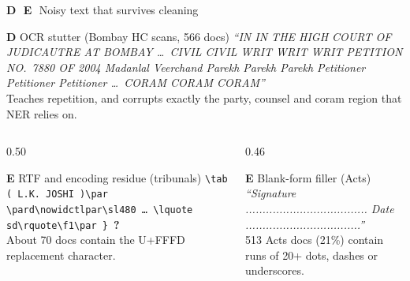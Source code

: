 \documentclass[aspectratio=169,11pt]{beamer}
\newcommand{\bs}{\textbackslash}
\newcommand{\pb}[1]{\textbf{\textcolor{warm}{#1}}}   %
\begin{document}
\begin{frame}{\pb{D}\,\, \pb{E}\,\, Noisy text that survives cleaning}
  \footnotesize
  \begin{block}{\pb{D} OCR stutter (Bombay HC scans, 566 docs)}
    \textit{``IN IN THE HIGH COURT OF JUDICAUTRE AT BOMBAY \ldots\ CIVIL CIVIL WRIT WRIT WRIT PETITION NO.\ 7880 OF 2004 Madanlal Veerchand Parekh Parekh Parekh Petitioner Petitioner Petitioner \ldots\ CORAM CORAM CORAM''}\\[1mm]
    Teaches repetition, and corrupts exactly the party, counsel and coram region that NER relies on.
  \end{block}
  \begin{columns}[T]
    \begin{column}{0.50\textwidth}
      \begin{block}{\pb{E} RTF and encoding residue (tribunals)}
        \texttt{\bs tab ( L.K. JOSHI )\bs par \bs pard\bs nowidctlpar\bs sl480 \ldots\ \bs lquote sd\bs rquote\bs f1\bs par \} }\textcolor{warm}{\textbf{?}}\\[1mm]
        About 70 docs contain the U+FFFD replacement character.
      \end{block}
    \end{column}
    \begin{column}{0.46\textwidth}
      \begin{block}{\pb{E} Blank-form filler (Acts)}
        \textit{``Signature .................................... Date ..................................''}\\[1mm]
        513 Acts docs (21\%) contain runs of 20+ dots, dashes or underscores.
      \end{block}
    \end{column}
  \end{columns}
\end{frame}
\end{document}
